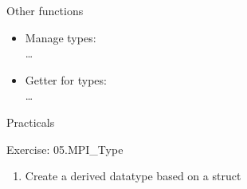 \documentclass[aspectratio=43]{beamer}
\begin{document}
\begin{frame}[fragile]{Other functions}
\begin{itemize}
    \item Manage types:\\\hspace{1cm} \ldots
    \item Getter for types:\\\hspace{1cm} \ldots
\end{itemize}
\end{frame}


\begin{frame}{Practicals}
    \begin{brown2block}{Exercise: 05.MPI\_Type}
    \begin{enumerate}
    \item Create a derived datatype based on a struct
    \end{enumerate}
    \end{brown2block}
\end{frame}



\end{document}
